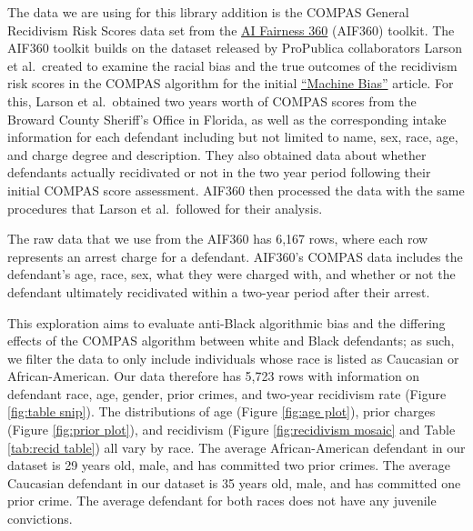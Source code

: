 \documentclass[water,article,submit,moreauthors,pdftex]{mdpi}
\begin{document}
The data we are using for this library addition is the COMPAS General
Recidivism Risk Scores data set from the
\href{https://aif360.readthedocs.io/en/stable/modules/generated/aif360.datasets.CompasDataset.html\#aif360.datasets.CompasDataset}{AI
Fairness 360} (AIF360) toolkit. The AIF360 toolkit builds on the dataset
released by ProPublica collaborators Larson et al.~created to examine
the racial bias and the true outcomes of the recidivism risk scores in
the COMPAS algorithm for the initial
\href{https://www.propublica.org/article/machine-bias-risk-assessments-in-criminal-sentencing}{``Machine
Bias''} article. For this, Larson et al.~obtained two years worth of
COMPAS scores from the Broward County Sheriff's Office in Florida, as
well as the corresponding intake information for each defendant
including but not limited to name, sex, race, age, and charge degree and
description. They also obtained data about whether defendants actually
recidivated or not in the two year period following their initial COMPAS
score assessment. AIF360 then processed the data with the same
procedures that Larson et al.~followed for their analysis.

The raw data that we use from the AIF360 has 6,167 rows, where each row
represents an arrest charge for a defendant. AIF360's COMPAS data
includes the defendant's age, race, sex, what they were charged with,
and whether or not the defendant ultimately recidivated within a
two-year period after their arrest.

This exploration aims to evaluate anti-Black algorithmic bias and the
differing effects of the COMPAS algorithm between white and Black
defendants; as such, we filter the data to only include individuals
whose race is listed as Caucasian or African-American. Our data
therefore has 5,723 rows with information on defendant race, age,
gender, prior crimes, and two-year recidivism rate (Figure
\ref{fig:table snip}). The distributions of age (Figure
\ref{fig:age plot}), prior charges (Figure \ref{fig:prior plot}), and
recidivism (Figure \ref{fig:recidivism mosaic} and Table
\ref{tab:recid table}) all vary by race. The average African-American
defendant in our dataset is 29 years old, male, and has committed two
prior crimes. The average Caucasian defendant in our dataset is 35 years
old, male, and has committed one prior crime. The average defendant for
both races does not have any juvenile convictions.
\end{document}
